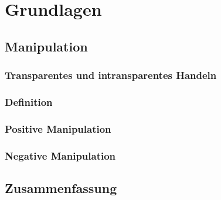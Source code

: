 \chapter{Grundlagen}
\label{chap:grundlagen}



\section{Manipulation}
\label{sec:manipulation}

\subsection{Transparentes und intransparentes Handeln}
\label{subsec:transparentes und intransparentes handeln}

\subsection{Definition}
\label{subsec:definition}

\subsection{Positive Manipulation}
\label{subsec:positive manipulation}

\subsection{Negative Manipulation}
\label{subsec:negative manipulation}

\section{Zusammenfassung}
\label{sec:zusammenfassung grundlagen}

